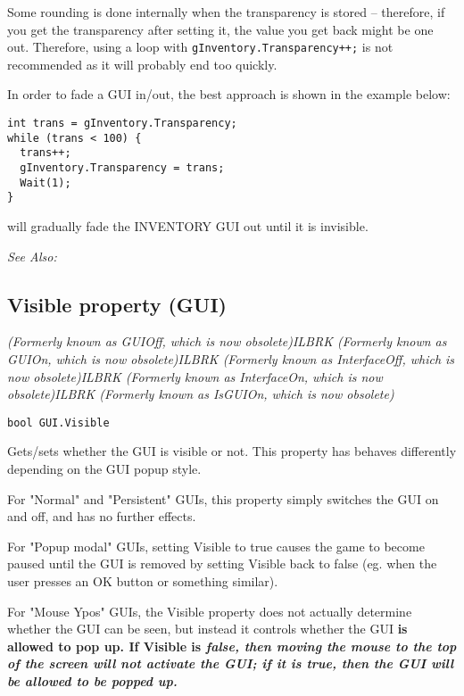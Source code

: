 Some rounding is done internally when the transparency is stored -- therefore, if you get
the transparency after setting it, the value you get back might be one out. Therefore, using
a loop with \verb$gInventory.Transparency++;$ is not recommended as it will probably
end too quickly.

In order to fade a GUI in/out, the best approach is shown in the example below:

\begin{verbatim}
int trans = gInventory.Transparency;
while (trans < 100) {
  trans++;
  gInventory.Transparency = trans;
  Wait(1);
}
\end{verbatim}
will gradually fade the INVENTORY GUI out until it is invisible.

\it{See Also:} 


\subsection{Visible property (GUI)}\label{GUI.Visible}%

\it{(Formerly known as GUIOff, which is now obsolete)}ILBRK
\it{(Formerly known as GUIOn, which is now obsolete)}ILBRK
\it{(Formerly known as InterfaceOff, which is now obsolete)}ILBRK
\it{(Formerly known as InterfaceOn, which is now obsolete)}ILBRK
\it{(Formerly known as IsGUIOn, which is now obsolete)}

\begin{verbatim}
bool GUI.Visible
\end{verbatim}
Gets/sets whether the GUI is visible or not. This property has behaves
differently depending on the GUI popup style.

For "Normal" and "Persistent" GUIs, this property simply switches the GUI
on and off, and has no further effects.

For "Popup modal" GUIs, setting Visible to true causes the game to become paused
until the GUI is removed by setting Visible back to false (eg. when the user
presses an OK button or something similar).

For "Mouse Ypos" GUIs, the Visible property does not actually determine whether
the GUI can be seen, but instead it controls whether the GUI \bf{is allowed to} pop up.
If Visible is \it{false}, then moving the mouse to the top of the screen will not activate
the GUI; if it is \it{true}, then the GUI will be allowed to be popped up.

